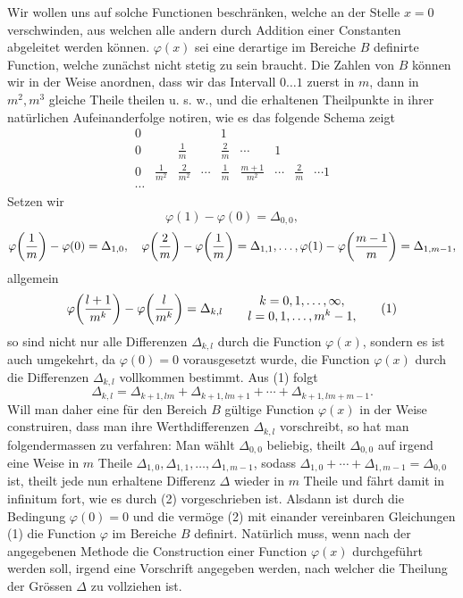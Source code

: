 Wir wollen uns auf solche Functionen beschränken, welche an der Stelle $x=0$ verschwinden, aus welchen alle andern durch Addition einer Constanten abgeleitet werden können. $\varphi(x)$ sei eine derartige im Bereiche $B$ definirte Function, welche zunächst nicht stetig zu sein braucht. Die Zahlen von $B$ können wir in der Weise anordnen, dass wir das Intervall $0\ldots1$ zuerst in $m$, dann in $m^2,m^3$ gleiche Theile theilen u. s. w., und die erhaltenen Theilpunkte in ihrer natürlichen Aufeinanderfolge notiren, wie es das folgende Schema zeigt
\[
\begin{array}{ccccccccc}
0&&&&1\\[2mm]
0&&\frac1m&&\frac2m&\cdots&1\\[2mm]
0&\frac1{m^2}&\frac2{m^2}&\cdots&\frac1m&\frac{m+1}{m^2}&\cdots&\frac2m&\cdots 1\\
\cdots&&&&&&&&
\end{array}
\]
Setzen wir
\[
\varphi(1)-\varphi(0)=\Delta_{0,0},
\]
\[
 \varphi\!\left({1\over m}\right)-\varphi(0)=\Delta_{1,0},\quad
 \varphi\!\left({2\over m}\right)-\varphi\!\left({1\over m}\right)=\Delta_{1,1},\ldots,
 \varphi(1)-\varphi\!\left({m-1\over m}\right)=\Delta_{1,m-1},
\]
allgemein
\begin{equation}
\varphi\!\left({l+1\over m^k}\right)-\varphi\!\left({l\over m^k}\right)=\Delta_{k,l}
\qquad
\begin{matrix}
 k=0,1,\ldots,\infty,\\
 l=0,1,\ldots,m^k-1,
\end{matrix}
\tag{1}
\end{equation}
so sind nicht nur alle Differenzen $\Delta_{k,l}$ durch die Function $\varphi(x)$, sondern es ist auch umgekehrt, da $\varphi(0)=0$ vorausgesetzt wurde, die Function $\varphi(x)$ durch die Differenzen $\Delta_{k,l}$ vollkommen bestimmt. Aus (1) folgt
\begin{equation}
 \Delta_{k,l}=\Delta_{k+1,lm}+\Delta_{k+1,lm+1}+\cdots+\Delta_{k+1,lm+m-1}.
\tag{2}
\end{equation}
Will man daher eine für den Bereich $B$ gültige Function $\varphi(x)$ in der Weise construiren, dass man ihre Werthdifferenzen $\Delta_{k,l}$ vorschreibt, so hat man folgendermassen zu verfahren: Man wählt $\Delta_{0,0}$ beliebig, theilt $\Delta_{0,0}$ auf irgend eine Weise in $m$ Theile $\Delta_{1,0},\Delta_{1,1},\ldots,\Delta_{1,m-1}$, sodass $\Delta_{1,0}+\cdots+\Delta_{1,m-1}=\Delta_{0,0}$ ist, theilt jede nun erhaltene Differenz $\Delta$ wieder in $m$ Theile und fährt damit in infinitum fort, wie es durch (2) vorgeschrieben ist. Alsdann ist durch die Bedingung $\varphi(0)=0$ und die vermöge (2) mit einander vereinbaren Gleichungen (1) die Function $\varphi$ im Bereiche $B$ definirt. Natürlich muss, wenn nach der angegebenen Methode die Construction einer Function $\varphi(x)$ durchgeführt werden soll, irgend eine Vorschrift angegeben werden, nach welcher die Theilung der Grössen $\Delta$ zu vollziehen ist.

